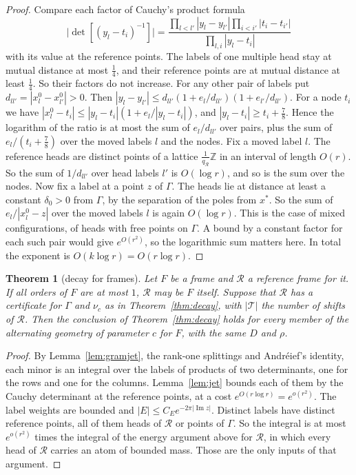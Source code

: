 \documentclass[11pt]{amsart}
\newtheorem{theorem}{Theorem}[section]
\theoremstyle{definition}
\theoremstyle{remark}
\numberwithin{equation}{section}
\newcommand{\Z}{\mathbb Z}
\renewcommand{\Im}{\operatorname{Im}}
\begin{document}
\begin{proof}
Compare each factor of Cauchy's product formula
\[
 \bigl|\det[(y_l-t_i)^{-1}]\bigr|=\frac{\prod_{l<l'}|y_l-y_{l'}|\prod_{i<i'}|t_i-t_{i'}|}{\prod_{l,i}|y_l-t_i|}
\]
with its value at the reference points. The labels of one multiple head stay at mutual distance at most $\frac14$,
and their reference points are at mutual distance at least $\frac14$. So their factors do not increase. For any other pair of
labels put $d_{ll'}=|x^0_l-x^0_{l'}|>0$. Then $|y_l-y_{l'}|\le d_{ll'}(1+e_l/d_{ll'})(1+e_{l'}/d_{ll'})$. For a node
$t_i$ we have $|x^0_l-t_i|\le|y_l-t_i|(1+e_l/|y_l-t_i|)$, and $|y_l-t_i|\ge t_i+\frac78$. Hence the logarithm of the
ratio is at most the sum of $e_l/d_{ll'}$ over pairs, plus the sum of $e_l/(t_i+\frac78)$ over the moved labels $l$ and
the nodes. Fix a moved label $l$. The reference heads are distinct points of a lattice $\frac1{q_{\mathcal R}}\Z$ in an
interval of length $O(r)$. So the sum of $1/d_{ll'}$ over head labels $l'$ is $O(\log r)$, and so is the sum over the
nodes. Now fix a label at a point $z$ of $\Gamma$. The heads lie at distance at least a constant $\delta_0>0$ from
$\Gamma$, by the separation of the poles from $x^*$. So the sum of $e_l/|x^0_l-z|$ over the moved labels $l$ is again
$O(\log r)$. This is the case of mixed configurations, of heads with free points on $\Gamma$. A bound by a constant
factor for each such pair would give $e^{O(r^2)}$, so the logarithmic sum matters here. In total the exponent is
$O(k\log r)=O(r\log r)$.
\end{proof}

\begin{theorem}[decay for frames]\label{thm:decayframe}
Let $F$ be a frame and $\mathcal R$ a reference frame for it. If all orders of $F$ are at most $1$, $\mathcal R$ may be
$F$ itself. Suppose that $\mathcal R$ has a certificate for $\Gamma$ and $\nu_c$ as in Theorem~\ref{thm:decay}, with
$|\mathcal T|$ the number of shifts of $\mathcal R$. Then the conclusion of Theorem~\ref{thm:decay} holds for every
member of the alternating geometry of parameter $c$ for $F$, with the same $D$ and $\rho$.
\end{theorem}
\begin{proof}
By Lemma~\ref{lem:gramjet}, the rank-one splittings and Andr\'eief's identity, each minor is an integral over the labels of
products of two determinants, one for the rows and one for the columns. Lemma~\ref{lem:jet} bounds each of them by the
Cauchy determinant at the reference points, at a cost $e^{O(r\log r)}=e^{o(r^2)}$. The label weights are bounded and
$|E|\le C_Ee^{-2\pi|\Im z|}$. Distinct labels have distinct reference points, all of them heads of $\mathcal R$ or points
of $\Gamma$. So the integral is at most $e^{o(r^2)}$ times the integral of the energy argument above for $\mathcal R$, in
which every head of $\mathcal R$ carries an atom of bounded mass. Those are the only inputs of that argument.
\end{proof}
\end{document}
